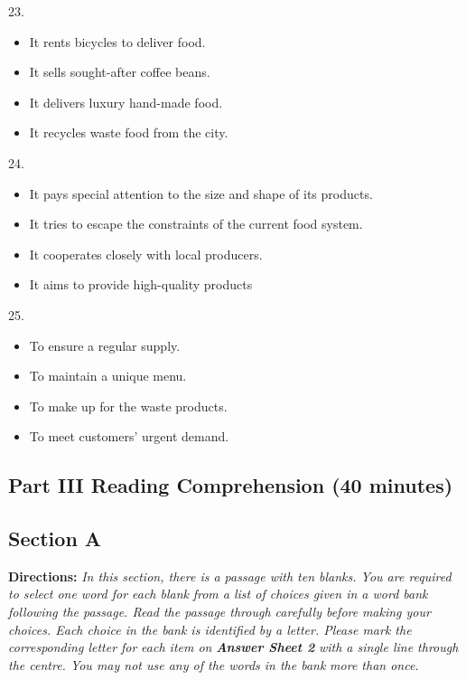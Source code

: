 \documentclass[UTF8,11pt]{ctexart}
\begin{document}
23.


\begin{itemize}[leftmargin=2em,itemsep=.2em,topsep=.4em]\item[A.] It rents bicycles to deliver food.
\item[B.] It sells sought-after coffee beans.
\item[C.] It delivers luxury hand-made food.
\item[D.] It recycles waste food from the city.
\end{itemize}

24.


\begin{itemize}[leftmargin=2em,itemsep=.2em,topsep=.4em]\item[A.] It pays special attention to the size and shape of its products.
\item[B.] It tries to escape the constraints of the current food system.
\item[C.] It cooperates closely with local producers.
\item[D.] It aims to provide high-quality products
\end{itemize}

25.


\begin{itemize}[leftmargin=2em,itemsep=.2em,topsep=.4em]\item[A.] To ensure a regular supply.
\item[B.] To maintain a unique menu.
\item[C.] To make up for the waste products.
\item[D.] To meet customers’ urgent demand.
\end{itemize}

\subsection*{\textbf{Part III Reading Comprehension (40 minutes)}}


\subsection*{\textbf{Section A}}


\textbf{Directions:} \textit{In this section, there is a passage with ten blanks. You are required to select one word for each blank} \textit{from a list of choices given in a word bank following the passage. Read the passage through carefully before} \textit{making your choices. Each choice in the bank is identified by a letter. Please mark the corresponding letter for} \textit{each item on }\textbf{\textit{Answer Sheet 2}}\textit{ with a single line through the centre. You may not use any of the words in the bank} \textit{more than once.}
\end{document}
